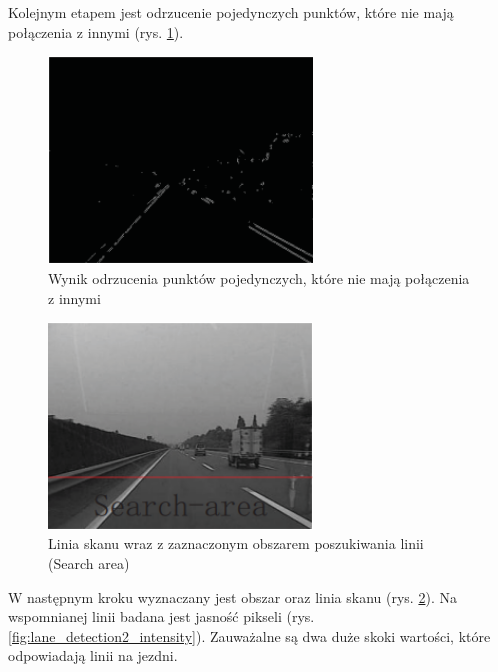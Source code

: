 Kolejnym etapem jest odrzucenie pojedynczych punktów, które nie mają połączenia z innymi (rys. \ref{fig:lane_detection2_noise2}).
\begin{figure}
  \centering
  \includegraphics[width=7cm]{img/lane_detection2_noise2.png}
  \caption{Wynik odrzucenia punktów pojedynczych, które nie mają połączenia z innymi\cite{T6}}
  \label{fig:lane_detection2_noise2}
\end{figure}

\begin{figure}
  \centering
  \includegraphics[width=7cm]{img/lane_detection2_search_line.png}
  \caption{Linia skanu wraz z zaznaczonym obszarem poszukiwania linii (Search area)\cite{T6}}
  \label{fig:lane_detection2_search_area}
\end{figure}

W następnym kroku wyznaczany jest obszar oraz linia skanu (rys. \ref{fig:lane_detection2_search_area}). Na wspomnianej linii badana jest jasność pikseli (rys. \ref{fig:lane_detection2_intensity}). Zauważalne są dwa duże skoki wartości, które odpowiadają linii na jezdni.


